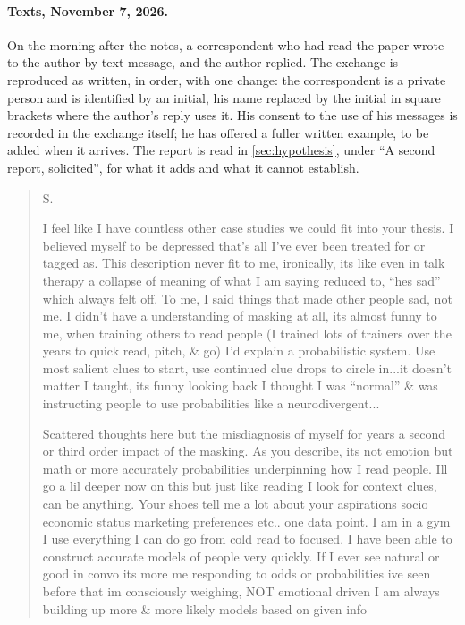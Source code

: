 \paragraph{Texts, November 7, 2026.}\label{app:texts} On the morning after the notes, a correspondent who had read the paper wrote to the author by text message, and the author replied. The exchange is reproduced as written, in order, with one change: the correspondent is a private person and is identified by an initial, his name replaced by the initial in square brackets where the author's reply uses it. His consent to the use of his messages is recorded in the exchange itself; he has offered a fuller written example, to be added when it arrives. The report is read in \autoref{sec:hypothesis}, under ``A second report, solicited'', for what it adds and what it cannot establish.
\begin{quote}
\noindent\textsc{S.}
\par\smallskip\noindent I feel like I have countless other case studies we could fit into your thesis. I believed myself to be depressed that's all I've ever been treated for or tagged as. This description never fit to me, ironically, its like even in talk therapy a collapse of meaning of what I am saying reduced to, ``hes sad'' which always felt off. To me, I said things that made other people sad, not me. I didn't have a understanding of masking at all, its almost funny to me, when training others to read people (I trained lots of trainers over the years to quick read, pitch, \& go) I'd explain a probabilistic system. Use most salient clues to start, use continued clue drops to circle in...it doesn't matter I taught, its funny looking back I thought I was ``normal'' \& was instructing people to use probabilities like a neurodivergent...
\par\smallskip\noindent Scattered thoughts here but the misdiagnosis of myself for years a second or third order impact of the masking. As you describe, its not emotion but math or more accurately probabilities underpinning how I read people. Ill go a lil deeper now on this but just like reading I look for context clues, can be anything. Your shoes tell me a lot about your aspirations socio economic status marketing preferences etc.. one data point. I am in a gym I use everything I can do go from cold read to focused. I have been able to construct accurate models of people very quickly. If I ever see natural or good in convo its more me responding to odds or probabilities ive seen before that im consciously weighing, NOT emotional driven I am always building up more \& more likely models based on given info

\end{quote}
